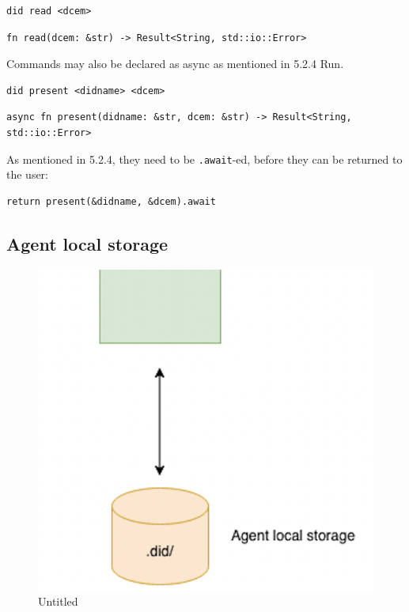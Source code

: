 \begin{lstlisting}
did read <dcem>
\end{lstlisting}

\begin{lstlisting}
fn read(dcem: &str) -> Result<String, std::io::Error>
\end{lstlisting}

Commands may also be declared as async as mentioned in 5.2.4 Run.

\begin{lstlisting}
did present <didname> <dcem>
\end{lstlisting}

\begin{lstlisting}
async fn present(didname: &str, dcem: &str) -> Result<String, std::io::Error>
\end{lstlisting}

As mentioned in 5.2.4, they need to be
\lstinline!.await!-ed, before they can be returned to the
user:

\begin{lstlisting}
return present(&didname, &dcem).await
\end{lstlisting}

\hypertarget{agent-local-storage}{%
\subsection{Agent local storage}\label{agent-local-storage}}

\begin{figure}
\centering
\includegraphics{Architecture 1442df162dbe45f4a423ba37d3e12363/Untitled 5.png}
\caption{Untitled}
\end{figure}

